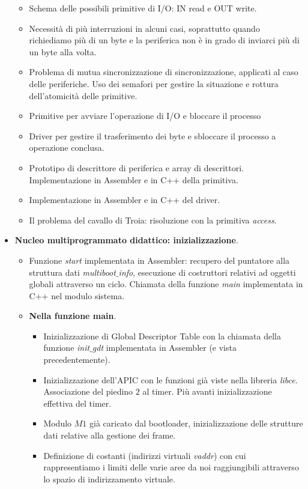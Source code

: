 \documentclass[11pt]{report}
\theoremstyle{definition}
\begin{document}
\begin{itemize}
\begin{itemize}
		\item Schema delle possibili primitive di I/O: IN read e OUT write. 
		\item Necessità di più interruzioni in alcuni casi, soprattutto quando richiediamo più di un byte e la periferica non è in grado di inviarci più di un byte alla volta. 
		\item Problema di mutua sincronizzazione di sincronizzazione, applicati al caso delle periferiche. Uso dei semafori per gestire la situazione e rottura dell'atomicità delle primitive.
		\item Primitive per avviare l'operazione di I/O e bloccare il processo
		\item Driver per gestire il trasferimento dei byte e sbloccare il processo a operazione conclusa.
		\item Prototipo di descrittore di periferica e array di descrittori. Implementazione in Assembler e in C++ della primitiva.
		\item Implementazione in Assembler e in C++ del driver.
		\item Il problema del cavallo di Troia: risoluzione con la primitiva \emph{access}.
	\end{itemize}
	\item \textbf{Nucleo multiprogrammato didattico: inizializzazione}.
	\begin{itemize}
		\item Funzione \emph{start} implementata in Assembler: recupero del puntatore alla struttura dati \emph{multiboot$\_$info}, esecuzione di costruttori relativi ad oggetti globali attraverso un ciclo. Chiamata della funzione \emph{main} implementata in C++ nel modulo sistema. 
		\item \textbf{Nella funzione main}.
		\begin{itemize}
			\item Inizializzazione di Global Descriptor Table con la chiamata della funzione \emph{init$\_$gdt} implementata in Assembler (e vista precedentemente).
			\item Inizializzazione dell'APIC con le funzioni già viste nella libreria \emph{libce}. Associazione del piedino $2$ al timer. Più avanti inizializzazione effettiva del timer.
			\item Modulo $M1$ già caricato dal bootloader, inizializzazione delle strutture dati relative alla gestione dei frame. 
			\item Definizione di costanti (indirizzi virtuali \emph{vaddr}) con cui rappresentiamo i limiti delle varie aree da noi raggiungibili attraverso lo spazio di indirizzamento virtuale. 

\end{itemize}
\end{itemize}
\end{itemize}
\end{document}
